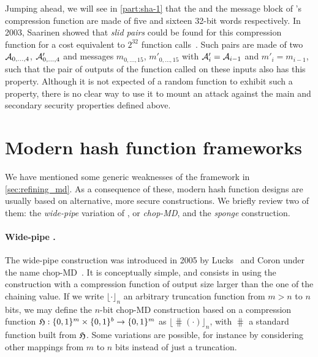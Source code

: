 Jumping ahead, we will see in \autoref{part:sha-1} that the \iv and the message block of \shaone's compression function are made of five and sixteen
32-bit words respectively. In 2003, Saarinen showed that \emph{slid pairs} could be found for this compression function for a cost equivalent to $2^{32}$
function calls~\cite{DBLP:conf/fse/Saarinen03}. Such pairs are made of two \ivs $\mathcal{A}_{0,\ldots,4}$, $\mathcal{A}'_{0,\ldots,4}$ and messages $m_{0,\ldots,15}$,
$m'_{0,\ldots,15}$ with $\mathcal{A}'_i = \mathcal{A}_{i-1}$ and $m'_i = m_{i-1}$, such that the
pair of outputs of the function called on these inputs also has this property. Although it is not expected of a random function to exhibit such a property, there is no clear way to use it to mount
an attack against the main and secondary security properties defined above.


\section{Modern hash function frameworks}
\label{sec:betterhash}

We have mentioned some generic weaknesses of the \merkdam framework in \autoref{sec:refining_md}. As a consequence of these, modern hash function designs are usually based on alternative,
more secure constructions. We briefly review two of them: the \emph{wide-pipe} variation of \merkdam, or \emph{chop-MD}, and the \emph{sponge} construction.

\paragraph{Wide-pipe \merkdam.} The wide-pipe construction was introduced in 2005 by Lucks~\cite{DBLP:conf/asiacrypt/Lucks05} and Coron \etal under the name chop-MD~\cite{DBLP:conf/crypto/CoronDMP05}.
It is conceptually simple, and consists in using the \merkdam construction with a compression function of output size larger than the one of the chaining value. If we write $\lfloor\cdot\rfloor_n$
an arbitrary truncation function from $m > n$ to $n$ bits, we may define the $n$-bit chop-MD construction based on a compression function $\operatorname{\mathfrak{H}} : \{0,1\}^m \times \{0,1\}^b \rightarrow \{0,1\}^m$
as $\lfloor\hash(\cdot)\rfloor_n$, with $\hash$ a standard \merkdam function built from $\operatorname{\mathfrak{H}}$. Some variations are possible, for instance by considering other mappings from $m$ to $n$
bits instead of just a truncation.

